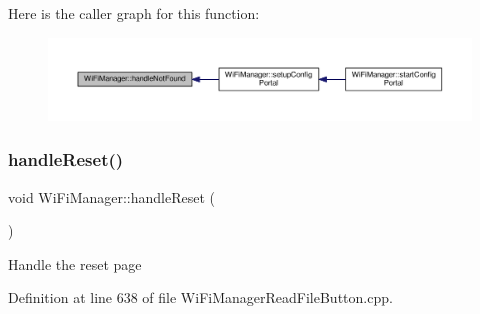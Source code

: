 Here is the caller graph for this function\+:\nopagebreak
\begin{figure}[H]
\begin{center}
\leavevmode
\includegraphics[width=350pt]{d4/dc8/class_wi_fi_manager_a7d01f7de3e4b76acdabffac79fa3d0ab_icgraph}
\end{center}
\end{figure}
\mbox{\label{class_wi_fi_manager_a94fb1a8fcfbd0d02714c69138bf72f9c}} 
\subsubsection{\texorpdfstring{handle\+Reset()}{handleReset()}}
{\footnotesize\ttfamily void Wi\+Fi\+Manager\+::handle\+Reset (\begin{DoxyParamCaption}{ }\end{DoxyParamCaption})\hspace{0.3cm}{\ttfamily [private]}}

Handle the reset page 

Definition at line 638 of file Wi\+Fi\+Manager\+Read\+File\+Button.\+cpp.


